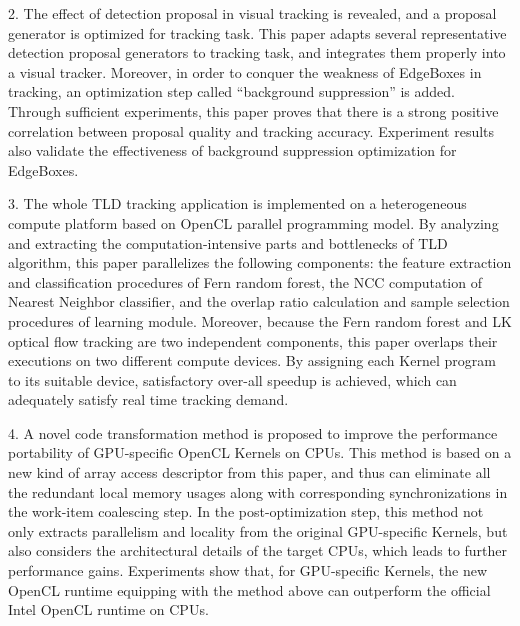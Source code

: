 \begin{eabstract}
2. The effect of detection proposal in visual tracking is revealed, and a proposal generator is optimized for tracking task. 
This paper adapts several representative detection proposal generators to tracking task, 
and integrates them properly into a visual tracker.
Moreover, in order to conquer the weakness of EdgeBoxes in tracking, 
an optimization step called ``background suppression'' is added.
Through sufficient experiments, this paper proves that there is a strong positive correlation between 
proposal quality and tracking accuracy.
Experiment results also validate the effectiveness of background suppression optimization for
EdgeBoxes.

3. The whole TLD tracking application is implemented on a heterogeneous compute platform
based on OpenCL parallel programming model.
By analyzing and extracting the computation-intensive parts and bottlenecks of TLD algorithm,
this paper parallelizes the following components: 
the feature extraction and classification procedures of Fern random forest,
the NCC computation of Nearest Neighbor classifier, and the overlap ratio calculation and sample
selection procedures of learning module.
Moreover, because the Fern random forest and LK optical flow tracking are two independent components, this paper overlaps their executions on two different compute devices.
By assigning each Kernel program to its suitable device, satisfactory over-all speedup is achieved,
which can adequately satisfy real time tracking demand.

4. A novel code transformation method is proposed to improve the performance portability of
GPU-specific OpenCL Kernels on CPUs.
This method is based on a new kind of array access descriptor from this paper,
and thus can eliminate all the redundant local memory usages along with corresponding
synchronizations in the work-item coalescing step.
In the post-optimization step, this method not only extracts parallelism
and locality from the original GPU-specific Kernels,
but also considers the architectural details of the target CPUs,
which leads to further performance gains.
Experiments show that, for GPU-specific Kernels, 
the new OpenCL runtime equipping with the method above can outperform the official
Intel OpenCL runtime on CPUs.
\end{eabstract}

